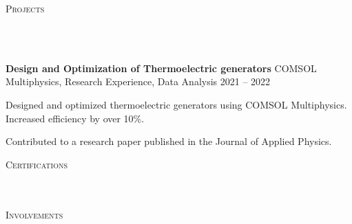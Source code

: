 \documentclass{article}
\newcommand{\project}[4]{{
          \vspace*{2pt}%
          \textbf{#1} #2 \hfill #3\\ #4 \vspace*{2pt}}
          }
\newcommand{\lineunder}{
        \vspace*{-8pt} \\ \hspace*{-18pt} 
        \hrulefill \\
        }
\newcommand{\header}[1]{{
        \hspace*{-15pt}\vspace*{6pt} \textsc{#1}} \vspace*{-6pt} 
        \lineunder
        }
\renewcommand{\labelitemii}{
        $\vcenter{\hbox{\tiny$\bullet$}}$\hspace*{-3pt}
        }
\newenvironment{bullet-list-minor}{
          \begin{list}{\labelitemii}{\setlength\leftmargin{15pt} 
            \topsep 0pt \itemsep -2pt}}{\vspace*{4pt}\end{list}
            }
\begin{document}
      \vspace*{4pt}%
      \header{Projects}
      {
      \project{Design and Optimization of Thermoelectric generators}{COMSOL Multiphysics, Research Experience, Data Analysis}{2021 -- 2022}{
          \begin{bullet-list-minor}
              \item Designed and optimized thermoelectric generators using COMSOL Multiphysics. Increased efficiency by over 10\%.
\item Contributed to a research paper published in the Journal of Applied Physics.
          \end{bullet-list-minor}
      }
  }
  
      \vspace*{4pt}%
      \header{Certifications}
      {}
      \vspace*{4pt}%
      \header{Involvements}
      {}
      
\end{document}
